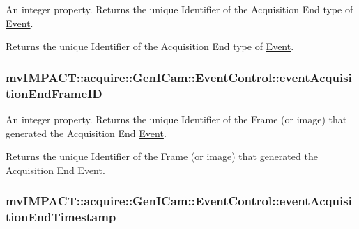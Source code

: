 An integer property. Returns the unique Identifier of the Acquisition End type of \hyperlink{classmv_i_m_p_a_c_t_1_1acquire_1_1_event}{Event}. 

Returns the unique Identifier of the Acquisition End type of \hyperlink{classmv_i_m_p_a_c_t_1_1acquire_1_1_event}{Event}. \hypertarget{classmv_i_m_p_a_c_t_1_1acquire_1_1_gen_i_cam_1_1_event_control_a4349a6a7793080c79248127a1b1669cc}{
\subsubsection[{event\+Acquisition\+End\+Frame\+I\+D}]{ mv\+I\+M\+P\+A\+C\+T\+::acquire\+::\+Gen\+I\+Cam\+::\+Event\+Control\+::event\+Acquisition\+End\+Frame\+I\+D}}\label{classmv_i_m_p_a_c_t_1_1acquire_1_1_gen_i_cam_1_1_event_control_a4349a6a7793080c79248127a1b1669cc}


An integer property. Returns the unique Identifier of the Frame (or image) that generated the Acquisition End \hyperlink{classmv_i_m_p_a_c_t_1_1acquire_1_1_event}{Event}. 

Returns the unique Identifier of the Frame (or image) that generated the Acquisition End \hyperlink{classmv_i_m_p_a_c_t_1_1acquire_1_1_event}{Event}. \hypertarget{classmv_i_m_p_a_c_t_1_1acquire_1_1_gen_i_cam_1_1_event_control_a52cf773458231c8d11751f3460d722ab}{
\subsubsection[{event\+Acquisition\+End\+Timestamp}]{ mv\+I\+M\+P\+A\+C\+T\+::acquire\+::\+Gen\+I\+Cam\+::\+Event\+Control\+::event\+Acquisition\+End\+Timestamp}}\label{classmv_i_m_p_a_c_t_1_1acquire_1_1_gen_i_cam_1_1_event_control_a52cf773458231c8d11751f3460d722ab}


